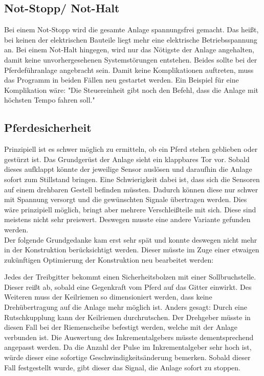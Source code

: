 \subsection{Not-Stopp/ Not-Halt}
\label{sec:notstop}

Bei einem Not-Stopp wird die gesamte Anlage spannungsfrei gemacht. Das heißt, bei keinen der elektrischen Bauteile liegt mehr eine elektrische Betriebsspannung an. Bei einem Not-Halt hingegen, wird nur das Nötigste der Anlage angehalten, damit keine unvorhergesehenen Systemstörungen entstehen. Beides sollte bei der Pferdeführanlage angebracht sein. Damit keine Komplikationen auftreten, muss das Programm in beiden Fällen neu gestartet werden. Ein Beispiel für eine Komplikation wäre: "{}Die Steuereinheit gibt noch den Befehl, dass die Anlage mit höchsten Tempo fahren soll."{} 
\newpage

\subsection{Pferdesicherheit}
\label{sec:pferdesicherheit}

Prinzipiell ist es schwer möglich zu ermitteln, ob ein Pferd stehen geblieben oder gestürzt ist. Das Grundgerüst der Anlage sieht ein klappbares Tor vor. Sobald dieses aufklappt könnte der jeweilige Sensor auslösen und daraufhin die Anlage sofort zum Stillstand bringen. Eine Schwierigkeit dabei ist, dass sich die Sensoren auf einem drehbaren Gestell befinden müssten. Dadurch können diese nur schwer mit Spannung versorgt und die gewünschten Signale übertragen werden. Dies wäre prinzipiell möglich, bringt aber mehrere Verschleißteile mit sich. Diese sind meistens nicht sehr preiswert. Deswegen musste eine andere Variante gefunden werden. \\
Der folgende Grundgedanke kam erst sehr spät und konnte deswegen nicht mehr in der Konstruktion berücksichtigt werden. Dieser müsste im Zuge einer etwaigen zukünftigen Optimierung der Konstruktion neu bearbeitet werden:\newline{}

Jedes der Treibgitter bekommt einen Sicherheitsbolzen mit einer Sollbruchstelle. Dieser reißt ab, sobald eine Gegenkraft vom Pferd auf das Gitter einwirkt. Des Weiteren muss der Keilriemen so dimensioniert werden, dass keine Drehübertragung auf die Anlage mehr möglich ist. Anders gesagt: Durch eine Rutschkupplung kann der Keilriemen durchrutschen. Der Drehgeber müsste in diesen Fall bei der Riemenscheibe befestigt werden, welche mit der Anlage verbunden ist. Die Auswertung des Inkrementalgebers müsste dementsprechend angepasst werden. Da die Anzahl der Pulse im Inkrementalgeber sehr hoch ist, würde dieser eine sofortige Geschwindigkeitsänderung bemerken. Sobald dieser Fall festgestellt wurde, gibt dieser das Signal, die Anlage sofort zu stoppen. \newline{}

